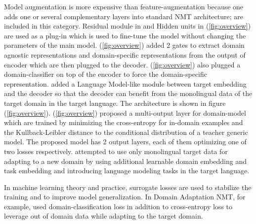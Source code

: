 \documentclass[12pt,a4paper,twoside]{report}
\theoremstyle{definition}
\begin{document}
Model augmentation is more expensive than feature-augmentation because one adds one or several complementary layers into standard NMT architecture; \cite{bapna19simple,Michel18extreme,Zheng18multi,Vilar18learning,Britz2017mixing} are included in this category. Residual module in \cite{bapna19simple} and Hidden units in \cite{Vilar18learning} (\ref{fig:overview}) are used as a plug-in which is used to fine-tune the model without
changing the parameters of the main model. \citet{Zheng18multi} (\ref{fig:overview}) added 2 gates to extract domain agnostic representations and domain-specific representations from the output of encoder which are then plugged to the decoder. \cite{Britz2017mixing} (\ref{fig:overview}) also plugged a domain-classifier on top of the encoder to force the domain-specific representation. \cite{domhan2017using} added a Language Model-like module between target embedding and the decoder so that the decoder can benefit from the monolingual data of the target domain in the target language. The architecture is shown in figure (\ref{fig:overview}). \cite{dakwle17fine} (\ref{fig:overview}) proposed a multi-output layer for domain-model which are trained by minimizing the cross-entropy for in-domain examples and the Kullback-Leibler distance to
the conditional distribution of a teacher generic model. The proposed model has 2 output layers, each of them optimizing one of two losses respectively. \cite{Dou19Unsupervised} attempted to use only monolingual target data for adapting to a new domain by using additional learnable domain embedding and task embedding and introducing language modeling tasks in the target language. 

In machine learning theory and practice, surrogate losses are used to stabilize the training and to improve model generalization. In Domain Adaptation NMT, for example, \cite{Chen17cost} used domain-classification loss in addition to cross-entropy loss to leverage out of domain data while adapting to the target domain. 
\end{document}
